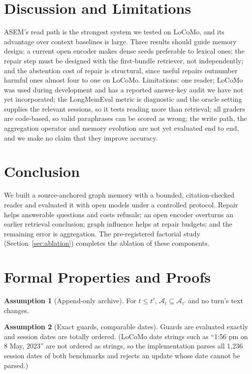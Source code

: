 \documentclass[10pt]{article}
\theoremstyle{plain}
\theoremstyle{definition}
\newtheorem{assumption}{Assumption}
\newcommand{\asem}{\textsc{ASEM}}
\newcommand{\A}{\mathcal{A}}
\begin{document}
\section{Discussion and Limitations}
\label{sec:discussion}

\asem{}'s read path is the strongest system we tested on LoCoMo, and its advantage over context baselines
is large. Three results should guide memory design: a current open encoder makes dense seeds preferable
to lexical ones; the repair step must be designed with the first-bundle retriever, not independently;
and the abstention cost of repair is structural, since useful repairs outnumber harmful ones almost four
to one on LoCoMo. Limitations: one reader; LoCoMo was used during development and has a reported
answer-key audit we have not yet incorporated; the LongMemEval metric is diagnostic and the oracle
setting supplies the relevant sessions, so it tests reading more than retrieval; all graders are
code-based, so valid paraphrases can be scored as wrong; the write path, the aggregation operator and
memory evolution are not yet evaluated end to end, and we make no claim that they improve accuracy.

\section{Conclusion}

We built a source-anchored graph memory with a bounded, citation-checked reader and evaluated it with open
models under a controlled protocol. Repair helps answerable questions and costs refusals; an open encoder
overturns an earlier retrieval conclusion; graph influence helps at repair budgets; and the remaining
error is aggregation. The pre-registered factorial study (Section~\ref{sec:ablation}) completes the
ablation of these components.




\appendix

\section{Formal Properties and Proofs}
\label{app:proofs}

\begin{assumption}[Append-only archive]\label{ass:archive}
For $t\le t'$, $\A_t\subseteq\A_{t'}$ and no turn's text changes.
\end{assumption}
\begin{assumption}[Exact guards, comparable dates]\label{ass:det}
Guards are evaluated exactly and session dates are totally ordered. (LoCoMo date strings such as
``1:56 pm on 8 May, 2023'' are not ordered as strings, so the implementation parses all 1,236 session
dates of both benchmarks and rejects an update whose date cannot be parsed.)
\end{assumption}
\end{document}
